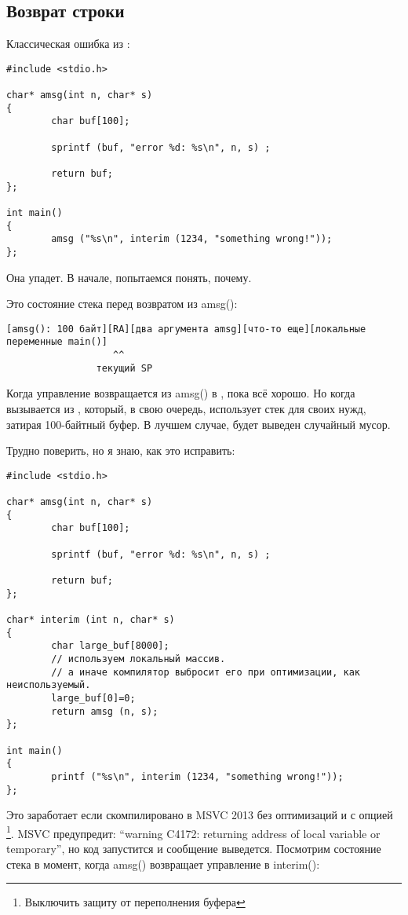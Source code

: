 \subsection{Возврат строки}

Классическая ошибка из \RobPikePractice{}:

\begin{lstlisting}[style=customc]
#include <stdio.h>

char* amsg(int n, char* s)
{
        char buf[100];

        sprintf (buf, "error %d: %s\n", n, s) ;

        return buf;
};

int main()
{
        amsg ("%s\n", interim (1234, "something wrong!"));
};
\end{lstlisting}

Она упадет.
В начале, попытаемся понять, почему.

Это состояние стека перед возвратом из amsg():

\begin{lstlisting}
[amsg(): 100 байт][RA][два аргумента amsg][что-то еще][локальные переменные main()]
                   ^^
                текущий SP
\end{lstlisting}

Когда управление возвращается из amsg() в \main, пока всё хорошо.
Но когда \printf вызывается из \main, который, в свою очередь, использует стек для своих нужд, затирая 100-байтный буфер.
В лучшем случае, будет выведен случайный мусор.

Трудно поверить, но я знаю, как это исправить:

\begin{lstlisting}[style=customc]
#include <stdio.h>

char* amsg(int n, char* s)
{
        char buf[100];

        sprintf (buf, "error %d: %s\n", n, s) ;

        return buf;
};

char* interim (int n, char* s)
{
        char large_buf[8000];
        // используем локальный массив.
        // а иначе компилятор выбросит его при оптимизации, как неиспользуемый.
        large_buf[0]=0;
        return amsg (n, s);
};

int main()
{
        printf ("%s\n", interim (1234, "something wrong!"));
};
\end{lstlisting}

Это заработает если скомпилировано в MSVC 2013 без оптимизаций и с опцией \footnote{Выключить защиту от переполнения буфера}.
MSVC предупредит: ``warning C4172: returning address of local variable or temporary'', но код запустится и сообщение выведется.
Посмотрим состояние стека в момент, когда amsg() возвращает управление в interim():

